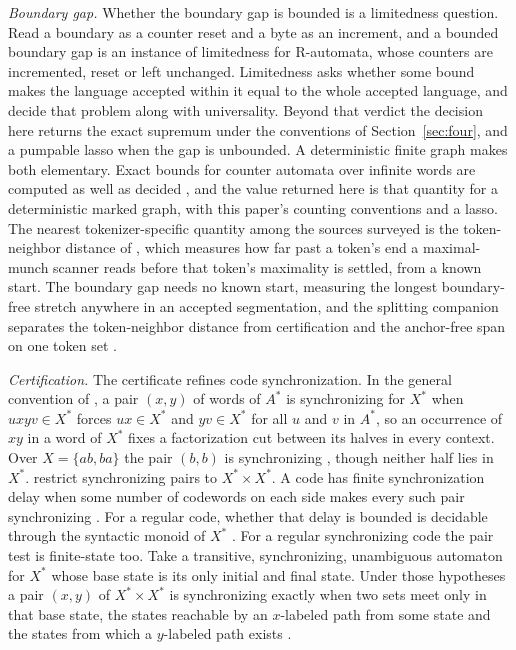 \documentclass[11pt,a4paper]{article}
\theoremstyle{definition}
\theoremstyle{plain}
\begin{document}
\emph{Boundary gap.} Whether the boundary gap is bounded is a limitedness question. Read a boundary as a counter reset
and a byte as an increment, and a bounded boundary gap is an instance of limitedness for R-automata, whose counters are
incremented, reset or left unchanged. Limitedness asks whether some bound makes the language accepted within it equal to
the whole accepted language, and \citet[Theorem~4]{abdulla2008rautomata} decide that problem along with universality.
Beyond that verdict the decision here returns the exact supremum under the conventions of Section~\ref{sec:four}, and a
pumpable lasso when the gap is unbounded. A deterministic finite graph makes both elementary. Exact bounds for counter
automata over infinite words are computed as well as decided \citep{colange2015bounds}, and the value returned here is
that quantity for a deterministic marked graph, with this paper's counting conventions and a lasso. The nearest
tokenizer-specific quantity among the sources surveyed is the token-neighbor distance of \citet{li2026streaming}, which
measures how far past a token's end a maximal-munch scanner reads before that token's maximality is settled, from a
known start. The boundary gap needs no known start, measuring the longest boundary-free stretch anywhere in an accepted
segmentation, and the splitting companion separates the token-neighbor distance from certification and the anchor-free
span on one token set \citep{nidhogg2026splitting}.

\emph{Certification.} The certificate refines code synchronization. In the general convention of
\citet[p.~373]{berstel2010codes}, a pair $(x, y)$ of words of $A^{*}$ is synchronizing for $X^{*}$ when $uxyv \in X^{*}$
forces $ux \in X^{*}$ and $yv \in X^{*}$ for all $u$ and $v$ in $A^{*}$, so an occurrence of $xy$ in a word of $X^{*}$
fixes a factorization cut between its halves in every context. Over $X = \{ab, ba\}$ the pair $(b, b)$ is synchronizing
\citep[Example~10.1.2]{berstel2010codes}, though neither half lies in $X^{*}$.
\citet[Definition~2]{carpi2017synchronizing} restrict synchronizing pairs to $X^{*} \times X^{*}$. A code has finite
synchronization delay when some number of codewords on each side makes every such pair synchronizing
\citep[Definition~1]{restivo1975synchronization}. For a regular code, whether that delay is bounded is decidable through
the syntactic monoid of $X^{*}$ \citep[Th\'eor\`eme~2]{lassez1976messages}. For a regular synchronizing code the pair
test is finite-state too. Take a transitive, synchronizing, unambiguous automaton for $X^{*}$ whose base state is its
only initial and final state. Under those hypotheses a pair $(x, y)$ of $X^{*} \times X^{*}$ is synchronizing exactly
when two sets meet only in that base state, the states reachable by an $x$-labeled path from some state and the states
from which a $y$-labeled path exists \citep[Lemma~2(4)]{carpi2017synchronizing}.
\end{document}

